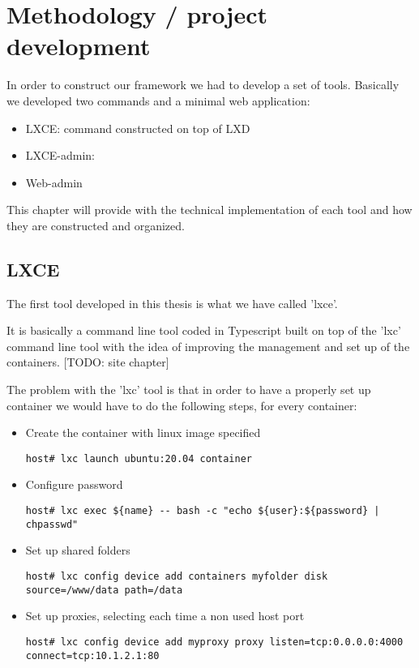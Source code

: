 \clearpage\section{Methodology / project development}

In order to construct our framework we had to develop a set of tools. Basically we developed two commands and a minimal web application:
\begin{itemize}
	\item{LXCE: command constructed on top of LXD}
	\item{LXCE-admin: }
	\item{Web-admin} 
\end{itemize}

This chapter will provide with the technical implementation of each tool and how they are constructed and organized. 

\subsection{LXCE}
The first tool developed in this thesis is what we have called 'lxce'.

It is basically a command line tool coded in Typescript built on top of the 'lxc' command line tool with the idea of improving the management and set up of the containers.
[TODO: site chapter]

The problem with the 'lxc' tool is that in order to have a properly set up container we would have to do the following steps, for every container:
\begin{itemize}
	\item{Create the container with linux image specified}
		\begin{verbatim}
host# lxc launch ubuntu:20.04 container
		\end{verbatim}
	\item{Configure password}
		\begin{verbatim}
host# lxc exec ${name} -- bash -c "echo ${user}:${password} | chpasswd"
		\end{verbatim}
	\item{Set up shared folders}
		\begin{verbatim}
host# lxc config device add containers myfolder disk source=/www/data path=/data
		\end{verbatim}
	\item{Set up proxies, selecting each time a non used host port}
		\begin{verbatim}
host# lxc config device add myproxy proxy listen=tcp:0.0.0.0:4000 connect=tcp:10.1.2.1:80
		\end{verbatim}
\end{itemize}

